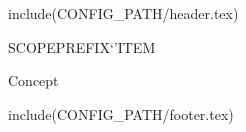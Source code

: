 include(CONFIG_PATH/header.tex)
\begin{ccRefFunctionObjectClass}SCOPE{PREFIX`'ITEM}  %


\ccDefinition
  



\ccIsModel

Concept

\ccTypes





\end{ccRefFunctionObjectClass}

include(CONFIG_PATH/footer.tex)

